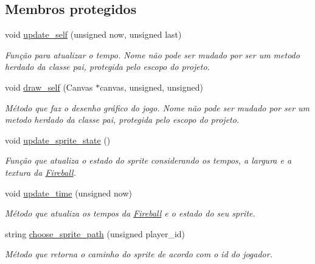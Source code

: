 \subsection*{Membros protegidos}
\begin{DoxyCompactItemize}
\item 
void \mbox{\hyperlink{classFireball_a73c9722b10f4d811031f270184265c4d}{update\+\_\+self}} (unsigned now, unsigned last)
\begin{DoxyCompactList}\small\item\em Função para atualizar o tempo. Nome não pode ser mudado por ser um metodo herdado da classe pai, protegida pelo escopo do projeto. \end{DoxyCompactList}\item 
void \mbox{\hyperlink{classFireball_a18f3cb8810d2e7e9bc5886b41fa03618}{draw\+\_\+self}} (Canvas $\ast$canvas, unsigned, unsigned)
\begin{DoxyCompactList}\small\item\em Método que faz o desenho gráfico do jogo. Nome não pode ser mudado por ser um metodo herdado da classe pai, protegida pelo escopo do projeto. \end{DoxyCompactList}\item 
void \mbox{\hyperlink{classFireball_a991b36830d1e36863ebca52dea50f9c3}{update\+\_\+sprite\+\_\+state}} ()
\begin{DoxyCompactList}\small\item\em Função que atualiza o estado do sprite considerando os tempos, a largura e a textura da \mbox{\hyperlink{classFireball}{Fireball}}. \end{DoxyCompactList}\item 
void \mbox{\hyperlink{classFireball_a0692c0ef038abdf5128f2bac3bfc5388}{update\+\_\+time}} (unsigned now)
\begin{DoxyCompactList}\small\item\em Método que atualiza os tempos da \mbox{\hyperlink{classFireball}{Fireball}} e o estado do seu sprite. \end{DoxyCompactList}\item 
string \mbox{\hyperlink{classFireball_a4a5554e5ffa7f3b7811815515dfcf6a4}{choose\+\_\+sprite\+\_\+path}} (unsigned player\+\_\+id)
\begin{DoxyCompactList}\small\item\em Método que retorna o caminho do sprite de acordo com o id do jogador. \end{DoxyCompactList}\end{DoxyCompactItemize}
